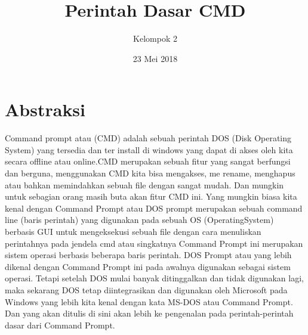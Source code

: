 \documentclass{article}
\title{Perintah Dasar CMD}
\author{Kelompok 2}
\date{23 Mei 2018}
\begin{document}
\maketitle
\section{Abstraksi}
Command prompt atau (CMD) adalah sebuah perintah DOS (Disk Operating System)  yang tersedia dan ter install di windows yang dapat di akses oleh kita secara offline atau online.CMD merupakan sebuah fitur yang sangat berfungsi dan berguna, menggunakan CMD kita bisa mengakses, me rename, menghapus atau bahkan memindahkan sebuah file dengan sangat mudah.
Dan mungkin untuk sebagian orang masih buta akan fitur CMD ini. Yang mungkin biasa kita kenal dengan Command Prompt atau DOS prompt merupakan sebuah command line (baris perintah) yang digunakan pada sebuah OS (OperatingSystem) berbasis GUI untuk mengeksekusi sebuah file dengan cara menuliskan perintahnya pada jendela cmd atau singkatnya Command Prompt ini merupakan sistem operasi berbasis beberapa baris perintah.
DOS Prompt atau yang lebih dikenal dengan Command Prompt ini pada awalnya digunakan sebagai sistem operasi. Tetapi setelah DOS mulai banyak ditinggalkan dan tidak digunakan lagi, maka sekarang DOS tetap diintegrasikan dan digunakan oleh Microsoft pada Windows yang lebih kita kenal dengan kata MS-DOS atau Command Prompt. Dan yang akan ditulis di sini akan lebih ke pengenalan pada perintah-perintah dasar dari Command Prompt.
\end{document}
